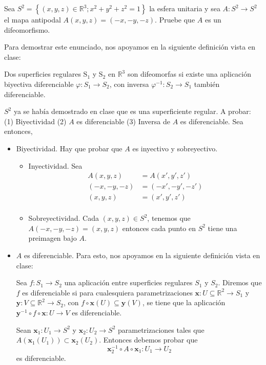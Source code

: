 \begin{problema}
    Sea $S^2=\left\{(x, y, z) \in \mathbb{R}^3 ; x^2+y^2+z^2=1\right\}$ la esfera unitaria y sea $A: S^2 \rightarrow S^2$ el mapa antipodal $A(x, y, z)=(-x,-y,-z)$. Pruebe que $A$ es un difeomorfismo.
    \begin{dem}
        Para demostrar este enunciado, nos apoyamos en la siguiente definición vista en clase:
        \begin{cajita}
Dos superficies regulares $\mathrm{S}_1$ y $\mathrm{S}_2$ en $\mathbb{R}^3$ son difeomorfas si existe una aplicación biyectiva diferenciable $\varphi: S_1 \rightarrow S_2$, con inversa $\varphi^{-1}: S_2 \rightarrow S_1$ también diferenciable.
        \end{cajita}
        $S^2$ ya se había demostrado en clase que es una superficiente regular. A probar: (1) Biyectividad (2) $A$ es diferenciable (3) Inversa de $A$ es diferenciable. 
        Sea entonces, 
        \begin{itemize}
            \item Biyectividad. Hay que probar que $A$ es inyectivo y sobreyectivo. \begin{itemize}
                \item Inyectividad. Sea
                \begin{align*}
                    A(x,y,z) &= A(x',y',z')\\
                    (-x, -y, -z) &= (-x', -y', -z')\\
                    (x, y, z) &= (x', y', z')\\
                \end{align*}
                \item Sobreyectividad. Cada $(x,y,z)\in S^2$, tenemos que $A(-x,-y,-z)= (x,y,z)$ entonces cada punto en $S^2$ tiene una preimagen bajo $A$. 
            \end{itemize}
            \item $A$ es diferenciable. Para esto, nos apoyamos en la siguiente definición vista en clase: 
            \begin{cajita}
                Sea $f: S_1 \rightarrow S_2$ una aplicación entre superficies regulares $S_1$ y $S_2$. Diremos que $f$ es diferenciable si para cualesquiera parametrizaciones $\mathbf{x}: U \subseteq \mathbb{R}^2 \rightarrow S_1$ y $\mathbf{y}: V \subseteq \mathbb{R}^2 \rightarrow S_2$, con $f \circ \mathbf{x}(U) \subseteq \mathbf{y}(V)$, se tiene que la aplicación $\mathbf{y}^{-1} \circ f \circ \mathbf{x}: U \rightarrow V$ es diferenciable.
            \end{cajita}
            Sean $\mathbf{x}_1:U_1\to S^2$ y $\mathbf{x}_2:U_2\to S^2$ parametrizaciones tales que $A(\mathbf{x}_1(U_1))\subset \mathbf{x}_2(U_2)$. Entonces debemos probar que $$ \mathbf{x}_2^{-1}\circ A\circ \mathbf{x}_1:U_1\to U_2 $$ es diferenciable.


\end{itemize}
\end{dem}
\end{problema}
